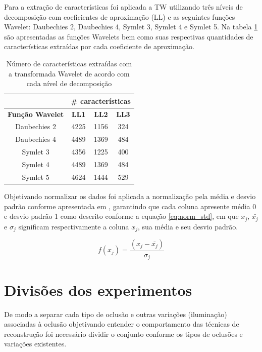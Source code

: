 Para a extração de características foi aplicada a TW utilizando três níveis de decomposição com coeficientes de aproximação (LL) e as seguintes funções Wavelet: Daubechies 2, Daubechies 4, Symlet 3, Symlet 4 e Symlet 5. Na tabela \ref{tab:coefWav} são apresentadas as funções Wavelets bem como suas respectivas quantidades de características extraídas por cada coeficiente de aproximação.

\begin{table}[H]
\caption{Número de características extraídas com a transformada Wavelet de acordo com cada nível de decomposição}
\centering
\begin{tabular}{|c|c|c|c|}
\cline{2-4}
 \multicolumn{1}{c|}{} & \multicolumn{3}{c|}{\textbf{\#  características}}\\ \hline
\multicolumn{1}{|c|}{\multirow{1}{*}{\textbf{Função Wavelet} }}& \textbf{LL1} &  \textbf{LL2} &  \textbf{LL3}   \\\hline
Daubechies 2 & 4225 & 1156 & 324 \\\hline
Daubechies 4 & 4489 & 1369 & 484 \\\hline
Symlet 3 & 4356 & 1225 & 400 \\\hline
Symlet 4 & 4489 & 1369 & 484 \\\hline
Symlet 5 & 4624 & 1444 & 529 \\\hline
\end{tabular}
\label{tab:coefWav}
\end{table}


Objetivando normalizar os dados foi aplicada a normalização pela média e desvio padrão conforme apresentada em \cite{galdi2016multimodal}, garantindo que cada coluna apresente média 0 e desvio padrão 1 como descrito conforme a equação \ref{eq:norm_std}, em que $x_j$, $\bar{x_j}$ e $\sigma_j$ significam respectivamente a coluna $x_j$, sua média e seu desvio padrão.

\begin{equation}
\label{eq:norm_std}
f(x_{j}) = \frac{(x_j - \bar{x_j})}{\sigma_j}  
\end{equation}


\section{Divisões dos experimentos} 


 
 De modo a separar cada tipo de oclusão e outras variações (iluminação) associadas à oclusão objetivando entender o comportamento das técnicas de reconstrução foi necessário dividir o conjunto conforme os tipos de oclusões e variações existentes.

